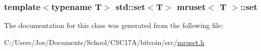 \subsubsection[{set}]{\setlength{\rightskip}{0pt plus 5cm}template$<$typename T$>$ std\+::set$<$T$>$ {\bf mruset}$<$ T $>$\+::set\hspace{0.3cm}{\ttfamily [protected]}}\label{classmruset_a4981fc3556b61600418b2ddad98cc685}


The documentation for this class was generated from the following file\+:\begin{DoxyCompactItemize}
\item 
C\+:/\+Users/\+Joe/\+Documents/\+School/\+C\+S\+C17\+A/bitcoin/src/\hyperlink{mruset_8h}{mruset.\+h}\end{DoxyCompactItemize}
